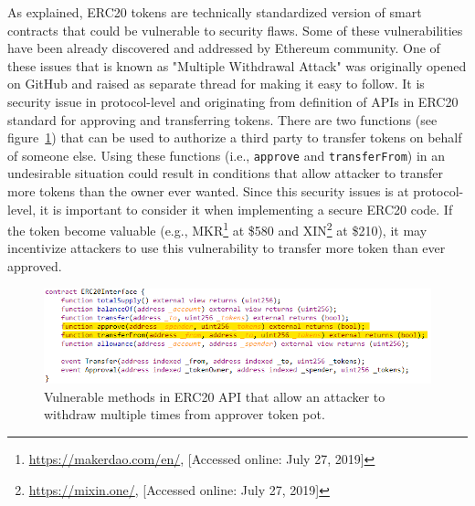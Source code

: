 
As explained, ERC20 tokens are technically standardized version of smart contracts that could be vulnerable to security flaws. Some of these vulnerabilities have been already discovered and addressed by Ethereum community. One of these issues that is known as "Multiple Withdrawal Attack" was originally opened on GitHub\cite{MikVlad} and raised as separate thread\cite{TomHale} for making it easy to follow. It is security issue in protocol-level and originating from definition of APIs in ERC20 standard for approving and transferring tokens. There are two functions (see figure~\ref{fig:mwaapi}) that can be used to authorize a third party to transfer tokens on behalf of someone else. Using these functions (i.e., \texttt{approve} and \texttt{transferFrom}) in an undesirable situation could result in conditions that allow attacker to transfer more tokens than the owner ever wanted. Since this security issues is at protocol-level, it is important to consider it when implementing a secure ERC20 code. If the token become valuable (e.g., MKR\footnote{\url{https://makerdao.com/en/}, [Accessed online: July 27, 2019]} at \$580 and XIN\footnote{\url{https://mixin.one/}, [Accessed online: July 27, 2019]} at \$210), it may incentivize attackers to use this vulnerability to transfer more token than ever approved.

\begin{figure}[t]
	\centering
	\includegraphics[width=1.0\linewidth]{figures/img14.png}
	\caption{Vulnerable methods in ERC20 API that allow an attacker to withdraw multiple times from approver token pot.}
	\label{fig:mwaapi}
\end{figure}


